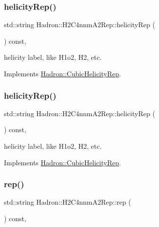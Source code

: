 \subsubsection{\texorpdfstring{helicityRep()}{helicityRep()}\hspace{0.1cm}{\footnotesize\ttfamily [2/3]}}
{\footnotesize\ttfamily std\+::string Hadron\+::\+H2\+C4nnm\+A2\+Rep\+::helicity\+Rep (\begin{DoxyParamCaption}{ }\end{DoxyParamCaption}) const\hspace{0.3cm}{\ttfamily [inline]}, {\ttfamily [virtual]}}

helicity label, like H1o2, H2, etc. 

Implements \mbox{\hyperlink{structHadron_1_1CubicHelicityRep_af1096946b7470edf0a55451cc662f231}{Hadron\+::\+Cubic\+Helicity\+Rep}}.

\mbox{\label{structHadron_1_1H2C4nnmA2Rep_a6f9741481d738e4bf6b7b5f035dac13c}} 
\subsubsection{\texorpdfstring{helicityRep()}{helicityRep()}\hspace{0.1cm}{\footnotesize\ttfamily [3/3]}}
{\footnotesize\ttfamily std\+::string Hadron\+::\+H2\+C4nnm\+A2\+Rep\+::helicity\+Rep (\begin{DoxyParamCaption}{ }\end{DoxyParamCaption}) const\hspace{0.3cm}{\ttfamily [inline]}, {\ttfamily [virtual]}}

helicity label, like H1o2, H2, etc. 

Implements \mbox{\hyperlink{structHadron_1_1CubicHelicityRep_af1096946b7470edf0a55451cc662f231}{Hadron\+::\+Cubic\+Helicity\+Rep}}.

\mbox{\label{structHadron_1_1H2C4nnmA2Rep_ab3b885d6ae0238dfffab82f55bbf4a2d}} 
\subsubsection{\texorpdfstring{rep()}{rep()}\hspace{0.1cm}{\footnotesize\ttfamily [1/5]}}
{\footnotesize\ttfamily std\+::string Hadron\+::\+H2\+C4nnm\+A2\+Rep\+::rep (\begin{DoxyParamCaption}{ }\end{DoxyParamCaption}) const\hspace{0.3cm}{\ttfamily [inline]}, {\ttfamily [virtual]}}




